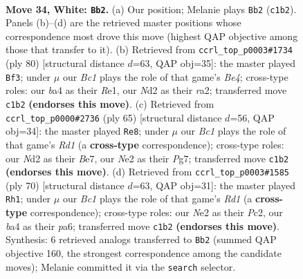 \documentclass[11pt]{article}
\begin{document}
\clearpage

\begin{figure}[p]\centering
\begin{subfigure}{0.46\textwidth}\centering
\resizebox{\linewidth}{!}{%
\newchessgame
\chessboard[
  setfen={r4k2/b3n3/8/pp2p3/b1p3P1/P1P5/3NNP2/R1B1K3 w - - 4 34},
  showmover=false,
  pgfstyle=straightmove, color=movearrow, markmove={c1-b2}
]}
\caption{}
\end{subfigure}\hfill
\begin{subfigure}{0.46\textwidth}\centering
\resizebox{\linewidth}{!}{%
\newchessgame
\chessboard[
  setfen={5k2/p1b2p2/1pN1p2p/1P5n/PP2B3/8/r4PP1/4RK2 w - - 6 41},
  showmover=false,
  pgfstyle=straightmove, color=movearrow, markmove={e4-f3}
]}
\caption{}
\end{subfigure}
\\[4pt]
\begin{subfigure}{0.46\textwidth}\centering
\resizebox{\linewidth}{!}{%
\newchessgame
\chessboard[
  setfen={3r2k1/4bpp1/1p6/3n2PP/3N4/2P1p3/1P6/1KB3R1 b - - 1 33},
  showmover=false,
  pgfstyle=straightmove, color=movearrow, markmove={d8-e8}
]}
\caption{}
\end{subfigure}\hfill
\begin{subfigure}{0.46\textwidth}\centering
\resizebox{\linewidth}{!}{%
\newchessgame
\chessboard[
  setfen={8/1pkb2r1/p3p2p/4P3/2pN1KP1/2P5/P1P5/3R4 w - - 2 36},
  showmover=false,
  pgfstyle=straightmove, color=movearrow, markmove={d1-h1}
]}
\caption{}
\end{subfigure}
\caption{\textbf{Move 34, White: \texttt{Bb2}.} (a) Our position; Melanie plays \texttt{Bb2} (\texttt{c1b2}). Panels (b)--(d) are the retrieved master positions whose correspondence most drove this move (highest QAP objective among those that transfer to it). (b) Retrieved from \texttt{ccrl\_top\_p0003\#1734} (ply 80) [structural distance $d$=63, QAP obj=35]: the master played \texttt{Bf3}; under $\mu$ our \emph{Bc1} plays the role of that game's \emph{Be4}; cross-type roles: our \emph{b}a4 as their \emph{R}e1, our \emph{N}d2 as their \emph{r}a2; transferred move \texttt{c1b2} \textbf{(endorses this move)}. (c) Retrieved from \texttt{ccrl\_top\_p0000\#2736} (ply 65) [structural distance $d$=56, QAP obj=34]: the master played \texttt{Re8}; under $\mu$ our \emph{Bc1} plays the role of that game's \emph{Rd1} (a \textbf{cross-type} correspondence); cross-type roles: our \emph{N}d2 as their \emph{B}e7, our \emph{N}e2 as their \emph{P}g7; transferred move \texttt{c1b2} \textbf{(endorses this move)}. (d) Retrieved from \texttt{ccrl\_top\_p0003\#1585} (ply 70) [structural distance $d$=63, QAP obj=31]: the master played \texttt{Rh1}; under $\mu$ our \emph{Bc1} plays the role of that game's \emph{Rd1} (a \textbf{cross-type} correspondence); cross-type roles: our \emph{N}e2 as their \emph{P}c2, our \emph{b}a4 as their \emph{p}a6; transferred move \texttt{c1b2} \textbf{(endorses this move)}. Synthesis: 6 retrieved analogs transferred to \texttt{Bb2} (summed QAP objective 160, the strongest correspondence among the candidate moves); Melanie committed it via the \texttt{search} selector.}
\label{fig:thought-m66}
\end{figure}
\end{document}
